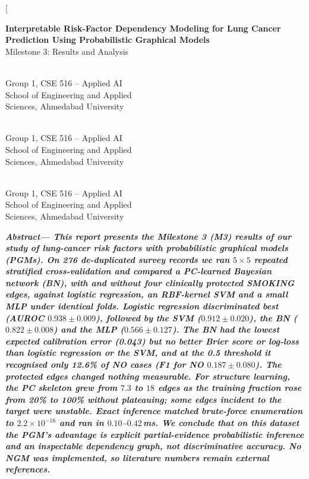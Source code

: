 \documentclass[10pt,twocolumn,letterpaper]{article}
\renewcommand{\_}{\textunderscore\hspace{0pt}}
\begin{document}
\twocolumn[{%
\begin{center}
{\fontsize{17}{20}\selectfont\bfseries Interpretable Risk-Factor Dependency Modeling for Lung Cancer Prediction Using Probabilistic Graphical Models}\\[5pt]
{\large Milestone 3: Results and Analysis}\\[9pt]
\begin{minipage}[t]{2.2in}\\[1pt]\small Group 1, CSE 516 -- Applied AI\\ School of Engineering and Applied\\ Sciences, Ahmedabad University\end{minipage}\hfill\begin{minipage}[t]{2.2in}\\[1pt]\small Group 1, CSE 516 -- Applied AI\\ School of Engineering and Applied\\ Sciences, Ahmedabad University\end{minipage}\hfill\begin{minipage}[t]{2.2in}\\[1pt]\small Group 1, CSE 516 -- Applied AI\\ School of Engineering and Applied\\ Sciences, Ahmedabad University\end{minipage}
\end{center}
\vspace{6pt}
\begin{center}
\begin{minipage}{6.95in}
\small\itshape\bfseries Abstract---\mdseries
This report presents the Milestone 3 (M3) results of our study of lung-cancer risk factors with probabilistic graphical models (PGMs). On 276 de-duplicated survey records we ran $5\times5$ repeated stratified cross-validation and compared a PC-learned Bayesian network (BN), with and without four clinically protected SMOKING edges, against logistic regression, an RBF-kernel SVM and a small MLP under identical folds. Logistic regression discriminated best (AUROC $0.938\pm0.009$), followed by the SVM ($0.912\pm0.020$), the BN ($0.822\pm0.008$) and the MLP ($0.566\pm0.127$). The BN had the lowest expected calibration error (0.043) but no better Brier score or log-loss than logistic regression or the SVM, and at the 0.5 threshold it recognised only 12.6\% of NO cases (F1 for NO $0.187\pm0.080$). The protected edges changed nothing measurable. For structure learning, the PC skeleton grew from $7.3$ to $18$ edges as the training fraction rose from 20\% to 100\% without plateauing; some edges incident to the target were unstable. Exact inference matched brute-force enumeration to $2.2\times10^{-16}$ and ran in $0.10$--$0.42$\,ms. We conclude that on this dataset the PGM's advantage is explicit partial-evidence probabilistic inference and an inspectable dependency graph, not discriminative accuracy. No NGM was implemented, so literature numbers remain external references.

\end{minipage}
\end{center}}
\end{document}
